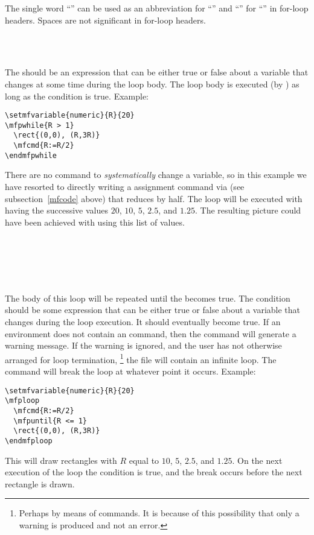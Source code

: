\documentclass[letterpaper]{article}
\begin{document}
The single word ``'' can be used as an abbreviation for
``'' and ``'' for ``''
in for-loop headers. Spaces are not significant in for-loop headers.

\begin{cd}
  \\
  \ \\
%
\end{cd}

The  should be an expression that can be either true or
false about a \MF{} variable that changes at some time during the loop
body. The loop body is executed (by \MF) as long as the condition is
true. Example:
\begin{verbatim}
\setmfvariable{numeric}{R}{20}
\mfpwhile{R > 1}
  \rect{(0,0), (R,3R)}
  \mfcmd{R:=R/2}
\endmfpwhile
\end{verbatim}
There are no \mfp{} command to \emph{systematically} change a variable,
so in this example we have resorted to directly writing a \MF{} assignment
command via  (see subsection~\ref{mfcode} above) that reduces
 by half. The loop will be executed with  having the
successive values $20$, $10$, $5$, $2.5$, and $1.25$. The resulting
picture could have been achieved with  using this list of
values.

\begin{cd}
\\
 \ \\
\\
 \ \\
%
%
%
%
\end{cd}

The body of this loop will be repeated until the 
becomes true. The condition should be some expression that can be either
true or false about a variable that changes during the loop execution.
It should eventually become true. If an  environment does
not contain an  command, then the  command
will generate a warning message. If the warning is ignored, and the user
has not otherwise arranged for loop termination,%
    \footnote{Perhaps by means of  commands. It is because of
    this possibility that only a warning is produced and not an error.}
the  file will contain an infinite loop. The 
command will break the loop at whatever point it occurs. Example:
\begin{verbatim}
\setmfvariable{numeric}{R}{20}
\mfploop
  \mfcmd{R:=R/2}
  \mfpuntil{R <= 1}
  \rect{(0,0), (R,3R)}
\endmfploop
\end{verbatim}
This will draw rectangles with $R$ equal to $10$, $5$, $2.5$, and
$1.25$. On the next execution of the loop the condition  is
true, and the break occurs before the next rectangle is drawn.
\end{document}
